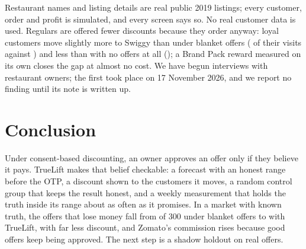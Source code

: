 \documentclass[conference]{IEEEtran}
\begin{document}
Restaurant names and listing details are real public 2019 listings; every customer, order and profit is
simulated, and every screen says so. No real customer data is used. Regulars are offered fewer discounts
because they order anyway: loyal customers move slightly more to Swiggy than under blanket offers
( of their visits against ) and less than with no offers at all
(); a Brand Pack reward measured on its own closes the gap at almost no cost.
We have begun interviews with restaurant owners; the first took place on 17 November 2026, and we
report no finding until its note is written up.

\section{Conclusion}
Under consent-based discounting, an owner approves an offer only if they believe it pays. TrueLift makes
that belief checkable: a forecast with an honest range before the OTP, a discount shown to the customers
it moves, a random control group that keeps the result honest, and a weekly measurement that holds the
truth inside its range about as often as it promises. In a market with known truth, the offers that lose
money fall from  of 300 under blanket offers to  with TrueLift, with far less
discount, and Zomato's commission rises because good offers keep being approved. The next step is a
shadow holdout on real offers.
\end{document}

